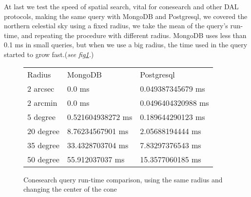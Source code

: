 \documentclass[11pt,twoside]{article}
\begin{document}
    At last we test the speed of spatial search, vital for conesearch and other DAL protocols, making the same query with MongoDB 
    and Postgresql, we covered the northern celestial sky using a fixed radius, we take the mean of the query's run-time, and repeating
    the procedure with different radius. MongoDB uses less than 0.1 ms in small queries, but when we use a big radius, the time used
    in the query started to grow fast.(\emph{see fig\ref{fig:cone}.})
\begin{figure}
\centering

\begin{tabular}{lll}
 Radius &MongoDB &Postgresql\\
2 arcsec&0.0 ms &0.049387345679 ms\\
2 arcmin&0.0 ms &0.0496404320988 ms\\
5 degree&0.521604938272 ms&0.189644290123 ms\\ 
20 degree &8.76234567901 ms&2.05688194444 ms\\
35 degree &33.4328703704 ms& 7.83297376543 ms\\
50 degree & 55.912037037 ms&15.3577060185 ms
\end{tabular}


\caption{Conesearch query run-time comparison, using the same radius and changing the center of the cone}
\label{fig:cone}
\end{figure}    
\end{document}
